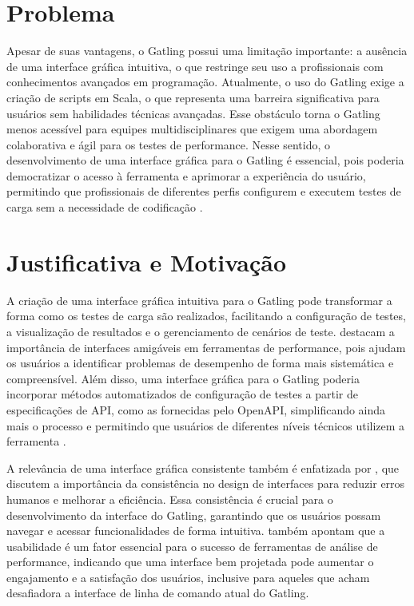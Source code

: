 \documentclass[
	12pt,
	openright,
	twoside,
	a4paper,
	english,
	brazil
	]{abntex2}
\begin{document}
\section{Problema}

Apesar de suas vantagens, o Gatling possui uma limitação importante: a ausência de uma interface gráfica intuitiva, o que restringe seu uso a profissionais com conhecimentos avançados em programação. Atualmente, o uso do Gatling exige a criação de scripts em Scala, o que representa uma barreira significativa para usuários sem habilidades técnicas avançadas. Esse obstáculo torna o Gatling menos acessível para equipes multidisciplinares que exigem uma abordagem colaborativa e ágil para os testes de performance. Nesse sentido, o desenvolvimento de uma interface gráfica para o Gatling é essencial, pois poderia democratizar o acesso à ferramenta e aprimorar a experiência do usuário, permitindo que profissionais de diferentes perfis configurem e executem testes de carga sem a necessidade de codificação \cite{Zhao}.

\section{Justificativa e Motivação}

A criação de uma interface gráfica intuitiva para o Gatling pode transformar a forma como os testes de carga são realizados, facilitando a configuração de testes, a visualização de resultados e o gerenciamento de cenários de teste. \cite{Cazzola} destacam a importância de interfaces amigáveis em ferramentas de performance, pois ajudam os usuários a identificar problemas de desempenho de forma mais sistemática e compreensível. Além disso, uma interface gráfica para o Gatling poderia incorporar métodos automatizados de configuração de testes a partir de especificações de API, como as fornecidas pelo OpenAPI, simplificando ainda mais o processo e permitindo que usuários de diferentes níveis técnicos utilizem a ferramenta \cite{Banias}.

A relevância de uma interface gráfica consistente também é enfatizada por \cite{Nordby}, que discutem a importância da consistência no design de interfaces para reduzir erros humanos e melhorar a eficiência. Essa consistência é crucial para o desenvolvimento da interface do Gatling, garantindo que os usuários possam navegar e acessar funcionalidades de forma intuitiva. \cite{Hossain} também apontam que a usabilidade é um fator essencial para o sucesso de ferramentas de análise de performance, indicando que uma interface bem projetada pode aumentar o engajamento e a satisfação dos usuários, inclusive para aqueles que acham desafiadora a interface de linha de comando atual do Gatling.
\end{document}
